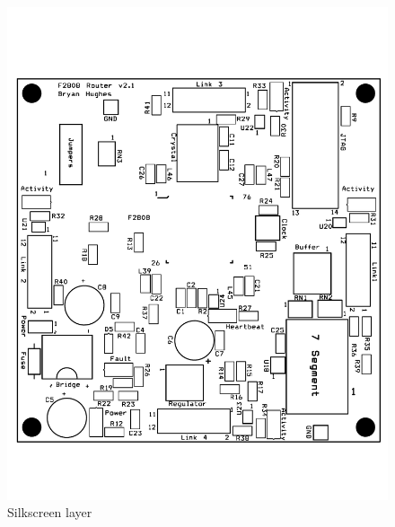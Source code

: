 \begin{appendices}
\begin{figure}[ptb]
	\begin{centering}
		\includegraphics[width=6in]{Appendices/Figures/appendices-layout_silkscreen.pdf}
		\caption{Silkscreen layer}
		\label{fig:appendices:layout_silkscreen}
	\end{centering}
\end{figure}


\end{appendices}
